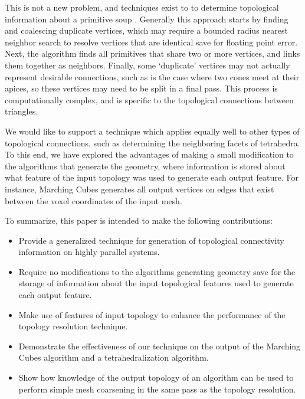 \documentclass[journal]{vgtc}                %
\begin{document}
This is not a new problem, and techniques exist to to determine topological
information about a primitive soup \cite{Park}. Generally this approach starts by finding 
and coalescing duplicate vertices, which may require a bounded radius nearest neighbor search to 
resolve vertices that are identical save for floating point error. Next, the algorithm finds all primitives that 
share two or more vertices, and links them together as neighbors. Finally,
some `duplicate' vertices may not actually represent desirable connections,
such as is the case where two cones meet at their apices, so these vertices
may need to be split in a final pass. This process is computationally complex, and is
specific to the topological connections between triangles. 

We would like to support a technique which applies equally well to other types of topological 
connections, such as determining the neighboring facets of tetrahedra. To this end, we have
explored the advantages of making a small modification to the algorithms that generate the
geometry, where information is stored about what feature of the input topology was used to generate
each output feature. For instance, Marching Cubes generates all output vertices on edges that
exist between the voxel coordinates of the input mesh.

To summarize, this paper is intended to make the following contributions:
\begin{itemize}
	\item{Provide a generalized technique for generation of topological connectivity information on highly parallel systems.}
	\item{Require no modifications to the algorithms generating geometry save for the
		storage of information about the input topological features used to generate each output feature.}

	\item{Make use of features of input topology to enhance the performance of the topology
		resolution technique.}

	\item{Demonstrate the effectiveness of our technique on the output of the Marching Cubes
		algorithm and a tetrahedralization algorithm.}
 
	\item{Show how knowledge of the output topology of an algorithm can be used to perform
		 simple mesh coarsening in the same pass as the topology resolution.}
 
\end{itemize}
\end{document}
